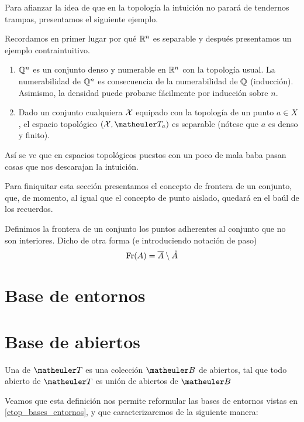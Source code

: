Para afianzar la idea de que en la topología la intuición no parará de tendernos trampas, presentamos el siguiente ejemplo.
\begin{exa}
	Recordamos en primer lugar por qué $\mathbb{R}^n$ es separable y después presentamos un ejemplo contraintuitivo.
	\begin{enumerate}
		\item $\mathbb{Q}^n$ es un conjunto denso y numerable en $\mathbb{R}^n$ con la topología usual. La numerabilidad de $\mathbb{Q}^n$ es consecuencia de la numerabilidad de $\mathbb{Q}$ (inducción). Asimismo, la densidad puede probarse fácilmente por inducción sobre $n$.
		\item Dado un conjunto cualquiera $\mathcal{X}$ equipado con la topología de un punto $a\in X$, el espacio topológico $(\X,\T_a)$ es separable (nótese que $a$ es denso y finito).
	\end{enumerate}
	Así se ve que en espacios topológicos puestos con un poco de mala baba pasan cosas que nos descarajan la intuición.
\end{exa}
Para finiquitar esta sección presentamos el concepto de frontera de un conjunto, que, de momento, al igual que el concepto de punto aislado, quedará en el baúl de los recuerdos.
\begin{defi}
	Definimos la frontera de un conjunto los puntos adherentes al conjunto que no son interiores. Dicho de otra forma (e introduciendo notación de paso)
	\begin{equation}
	\operatorname{\mathrm{Fr}}(A)=\overline{A}\setminus\mathring{A}
	\end{equation}
\end{defi}




\section{Base de entornos}
\begin{defi}
	\label{etop_bases_entornos}
\end{defi}

\section{Base de abiertos}
\begin{defi}
	\label{etop_bases_abiertos}
	Una  de $\T$ es una colección $\B$ de abiertos, tal que todo abierto de $\T$ es unión de abiertos de $\B$
\end{defi}
Veamos que esta definición nos permite reformular las bases de entornos vistas en \eqref{etop_bases_entornos}, y que caracterizaremos de la siguiente manera:


